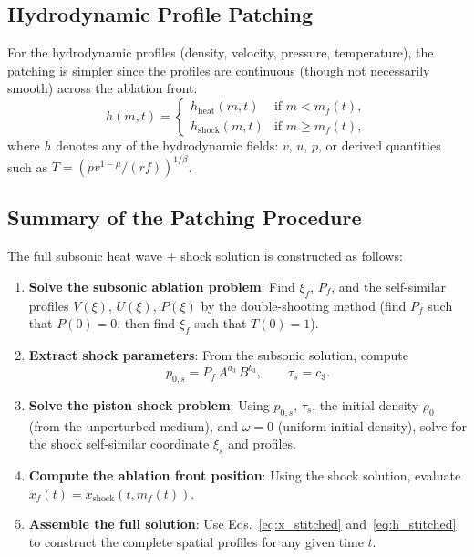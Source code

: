 \documentclass[11pt]{article}
\begin{document}
\subsection{Hydrodynamic Profile Patching}

For the hydrodynamic profiles (density, velocity, pressure, temperature), the patching is simpler since the profiles are continuous (though not necessarily smooth) across the ablation front:
\begin{equation}
  \boxed{
  h(m,t) = \begin{cases}
    h_{\mathrm{heat}}(m,t)
      & \text{if } m < m_f(t), \\[4pt]
    h_{\mathrm{shock}}(m,t)
      & \text{if } m \geq m_f(t),
  \end{cases}}
  \label{eq:h_stitched}
\end{equation}
where $h$ denotes any of the hydrodynamic fields: $v$, $u$, $p$, or derived quantities such as $T = (pv^{1-\mu}/(rf))^{1/\beta}$.

\subsection{Summary of the Patching Procedure}

The full subsonic heat wave + shock solution is constructed as follows:

\begin{enumerate}
  \item \textbf{Solve the subsonic ablation problem}: Find $\xi_f$, $P_f$, and the self-similar profiles $V(\xi)$, $U(\xi)$, $P(\xi)$ by the double-shooting method (find $P_f$ such that $P(0) = 0$, then find $\xi_f$ such that $T(0) = 1$).

  \item \textbf{Extract shock parameters}: From the subsonic solution, compute
  \begin{equation}
    p_{0,s} = P_f\,A^{a_3}\,B^{b_3}, \qquad
    \tau_s = c_3.
  \end{equation}

  \item \textbf{Solve the piston shock problem}: Using $p_{0,s}$, $\tau_s$, the initial density $\rho_0$ (from the unperturbed medium), and $\omega = 0$ (uniform initial density), solve for the shock self-similar coordinate $\xi_s$ and profiles.

  \item \textbf{Compute the ablation front position}: Using the shock solution, evaluate $x_f(t) = x_{\mathrm{shock}}(t, m_f(t))$.

  \item \textbf{Assemble the full solution}: Use Eqs.~\eqref{eq:x_stitched} and~\eqref{eq:h_stitched} to construct the complete spatial profiles for any given time $t$.
\end{enumerate}
\end{document}
